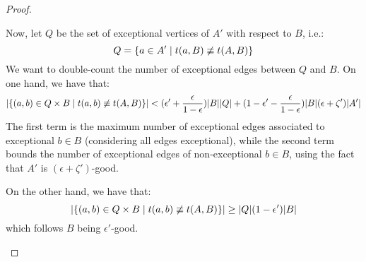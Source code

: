 \begin{lemma}[Claim 5.13]
\begin{proof}
\begin{enumerate}[label=(\alph*), ref=\alph*]
                    Now, let $Q$ be the set of exceptional vertices of $A'$ with respect to $B$, i.e.:
                    \[
                        Q = \{ a \in A' \mid t(a, B) \not\equiv t(A, B) \}
                    \]
                    We want to double-count the number of exceptional edges between $Q$ and $B$.
                    On one hand, we have that:
                    \[
                        | \{ (a,b) \in Q \times B \mid t(a, b) \not\equiv t(A, B) \} | <
                        ( \epsilon' + \frac{\epsilon}{1 - \epsilon} ) | B | | Q | +
                        ( 1 - \epsilon' - \frac{\epsilon}{1 - \epsilon} ) | B | ( \epsilon + \zeta' ) | A' |
                    \]
                    The first term is the maximum number of exceptional edges associated to exceptional $b \in B$
                    (considering all edges exceptional), while the second term bounds the number of exceptional edges of
                    non-exceptional $b \in B$, using the fact that $A'$ is $(\epsilon + \zeta')$-good.

                    On the other hand, we have that:
                    \[
                        | \{ (a,b) \in Q \times B \mid t(a, b) \not\equiv t(A, B) \} | \geq
                        | Q | ( 1 - \epsilon' ) | B |
                    \]
                    which follows $B$ being $\epsilon'$-good.


\end{enumerate}
\end{proof}
\end{lemma}
